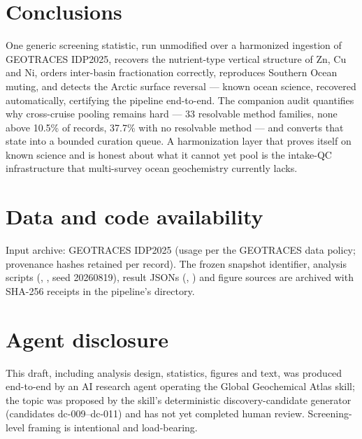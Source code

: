 \documentclass[11pt]{article}
\begin{document}
\section{Conclusions}
One generic screening statistic, run unmodified over a harmonized ingestion
of GEOTRACES IDP2025, recovers the nutrient-type vertical structure of Zn,
Cu and Ni, orders inter-basin fractionation correctly, reproduces Southern
Ocean muting, and detects the Arctic surface reversal --- known ocean
science, recovered automatically, certifying the pipeline end-to-end. The
companion audit quantifies why cross-cruise pooling remains hard --- 33
resolvable method families, none above 10.5\% of records, 37.7\% with no
resolvable method --- and converts that state into a bounded curation
queue. A harmonization layer that proves itself on known science and is
honest about what it cannot yet pool is the intake-QC infrastructure that
multi-survey ocean geochemistry currently lacks.

\section*{Data and code availability}
Input archive: GEOTRACES IDP2025 \cite{geotraces2025} (usage per the
GEOTRACES data policy; provenance hashes retained per record). The frozen
snapshot identifier, analysis scripts (,
, seed 20260819), result JSONs
(, )
and figure sources are archived with SHA-256 receipts in the pipeline's
 directory.

\section*{Agent disclosure}
This draft, including analysis design, statistics, figures and text, was
produced end-to-end by an AI research agent operating the Global
Geochemical Atlas skill; the topic was proposed by the skill's
deterministic discovery-candidate generator (candidates dc-009--dc-011) and
has not yet completed human review. Screening-level framing is intentional
and load-bearing.
\end{document}
